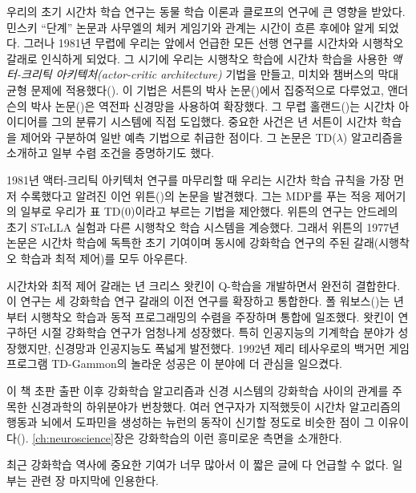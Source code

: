 우리의 초기 시간차 학습 연구는 동물 학습 이론과 클로프의 연구에 큰 영향을
받았다. 민스키 ``단계'' 논문과 사무엘의 체커 게임기와 관계는 시간이 흐른 후에야
알게 되었다. 그러나 1981년 무렵에 우리는 앞에서 언급한 모든 선행 연구를 시간차와
시행착오 갈래로 인식하게 되었다. 그 시기에 우리는 시행착오 학습에 시간차 학습을
사용한 \emph{액터-크리틱 아키텍처(actor-critic architecture)} 기법을 만들고,
미치와 챔버스의 막대 균형 문제에 적용했다(\cite{BartoSuttonAnderson1983}). 이
기법은 서튼의 박사 논문(\cite*{Sutton1984})에서 집중적으로 다루었고, 앤더슨의
박사 논문(\cite*{Anderson1986})은 역전파 신경망을 사용하여 확장했다. 그 무렵
홀랜드(\cite*{Holland1986})는 시간차 아이디어를 그의 분류기 시스템에 직접
도입했다. 중요한 사건은 \cite*{Sutton1988}년 서튼이 시간차 학습을 제어와
구분하여 일반 예측 기법으로 취급한 점이다. 그 논문은 TD($\lambda$) 알고리즘을
소개하고 일부 수렴 조건을 증명하기도 했다.

1981년 액터-크리틱 아키텍처 연구를 마무리할 때 우리는 시간차 학습 규칙을 가장
먼저 수록했다고 알려진 이언 위튼(\cite{Witten1977})의 논문을 발견했다. 그는
MDP를 푸는 적응 제어기의 일부로 우리가 표 TD(0)이라고 부르는 기법을 제안했다.
위튼의 연구는 안드레의 초기 STeLLA 실험과 다른 시행착오 학습 시스템을 계승했다.
그래서 위튼의 1977년 논문은 시간차 학습에 독특한 초기 기여이며 동시에 강화학습
연구의 주된 갈래(시행착오 학습과 최적 제어)를 모두 아우른다.


시간차와 최적 제어 갈래는 \cite*{Watkins1989}년 크리스 왓킨이 Q-학습을
개발하면서 완전히 결합한다. 이 연구는 세 강화학습 연구 갈래의 이전 연구를
확장하고 통합한다. 폴 워보스(\cite{Werbos1987})는 \cite*{Werbos1977}년부터
시행착오 학습과 동적 프로그래밍의 수렴을 주장하며 통합에 일조했다. 왓킨이
연구하던 시절 강화학습 연구가 엄청나게 성장했다. 특히 인공지능의 기계학습 분야가
성장했지만, 신경망과 인공지능도 폭넓게 발전했다. 1992년 제리 테사우로의 백거먼
게임 프로그램 TD-Gammon의 놀라운 성공은 이 분야에 더 관심을 일으켰다.

이 책 초판 출판 이후 강화학습 알고리즘과 신경 시스템의 강화학습 사이의 관계를
주목한 신경과학의 하위분야가 번창했다. 여러 연구자가 지적했듯이 시간차
알고리즘의 행동과 뇌에서 도파민을 생성하는 뉴런의 동작이 신기할 정도로 비슷한
점이 그 이유이다(\cite{FristonEt1994, Barto1995a, HoukAdamsBarto1995,
MontagueDayanSejnowski1996, SchultzDayanMontague1997}).
\ref{ch:neuroscience}장은 강화학습의 이런 흥미로운 측면을 소개한다.

최근 강화학습 역사에 중요한 기여가 너무 많아서 이 짧은 글에 다 언급할 수 없다.
일부는 관련 장 마지막에 인용한다.

